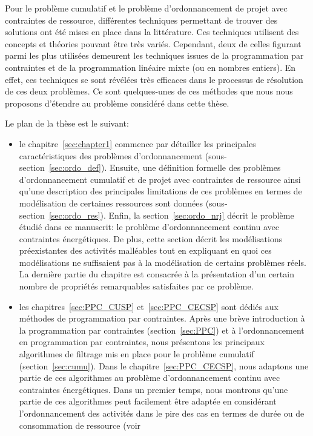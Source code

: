 Pour le problème cumulatif et le problème d'ordonnancement de projet
avec contraintes de ressource, différentes techniques permettant de
trouver des solutions ont été mises en place dans la littérature. Ces
techniques utilisent des concepts et théories pouvant être très
variés. Cependant, deux de celles figurant parmi les plus utilisées
demeurent les techniques issues de la programmation par contraintes et
de la programmation linéaire mixte (ou en nombres entiers). En effet,
ces techniques se sont révélées très efficaces dans le processus de
résolution de ces deux problèmes. Ce sont quelques-unes de ces
méthodes que nous nous proposons d'étendre au problème considéré dans
cette thèse.

Le plan de la thèse est le suivant: 
\begin{itemize}
\item le chapitre~\ref{sec:chapter1} commence par détailler les
principales caractéristiques des problèmes d'ordonnancement
(sous-section~\ref{sec:ordo_def}). Ensuite, une définition formelle des
problèmes d'ordonnancement cumulatif et de projet
avec contraintes de ressource ainsi qu'une description des principales
limitations de ces problèmes en termes de modélisation de certaines
ressources sont données
(sous-section~\ref{sec:ordo_res}).  Enfin, la
section~\ref{sec:ordo_nrj} décrit le problème étudié dans ce 
manuscrit: le problème d'ordonnancement continu avec contraintes
énergétiques. De plus, cette section décrit les modélisations
préexistantes des activités malléables tout en expliquant en quoi ces
modélisations ne suffisaient pas à la modélisation de certains problèmes
réels. La dernière partie du chapitre est consacrée à la présentation
d'un certain nombre de propriétés remarquables satisfaites par ce problème.
\item les chapitres~\ref{sec:PPC_CUSP} et~\ref{sec:PPC_CECSP} sont
  dédiés aux méthodes de programmation par
  contraintes. Après une brève introduction à la programmation par
  contraintes (section~\ref{sec:PPC}) et à l'ordonnancement en
  programmation par contraintes, nous
  présentons les principaux algorithmes de filtrage mis en place pour
  le problème cumulatif (section~\ref{sec:cumu}). Dans le
  chapitre~\ref{sec:PPC_CECSP}, nous adaptons une partie de ces
  algorithmes au problème d'ordonnancement continu avec contraintes
  énergétiques. Dans un premier temps, nous montrons qu'une partie de
  ces algorithmes peut facilement être adaptée en considérant
  l'ordonnancement des activités dans le pire des cas en termes de
  durée ou de consommation de ressource (voir 

\end{itemize}
